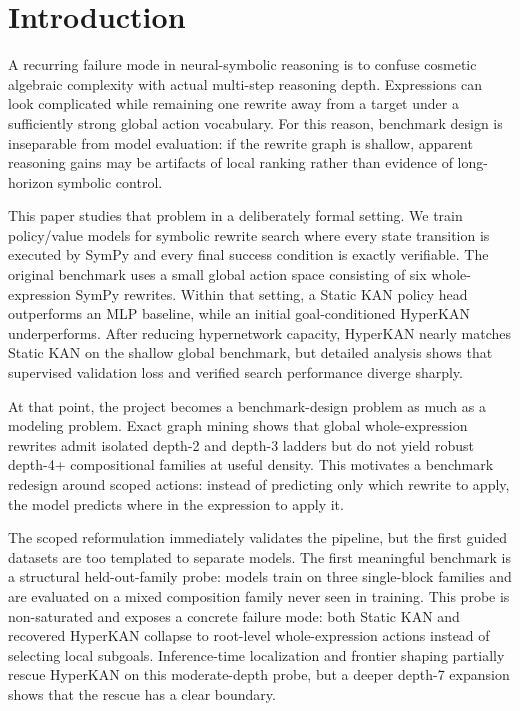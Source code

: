 \documentclass[11pt]{article}
\newcommand{\sympy}{SymPy}
\newcommand{\hyperkan}{HyperKAN}
\newcommand{\staticKAN}{Static KAN}
\newcommand{\mlp}{MLP}
\begin{document}
\section{Introduction}

A recurring failure mode in neural-symbolic reasoning is to confuse cosmetic algebraic complexity with actual multi-step reasoning depth. Expressions can look complicated while remaining one rewrite away from a target under a sufficiently strong global action vocabulary. For this reason, benchmark design is inseparable from model evaluation: if the rewrite graph is shallow, apparent reasoning gains may be artifacts of local ranking rather than evidence of long-horizon symbolic control.

This paper studies that problem in a deliberately formal setting. We train policy/value models for symbolic rewrite search where every state transition is executed by \sympy{} and every final success condition is exactly verifiable. The original benchmark uses a small global action space consisting of six whole-expression \sympy{} rewrites. Within that setting, a \staticKAN{} policy head outperforms an \mlp{} baseline, while an initial goal-conditioned \hyperkan{} underperforms. After reducing hypernetwork capacity, \hyperkan{} nearly matches \staticKAN{} on the shallow global benchmark, but detailed analysis shows that supervised validation loss and verified search performance diverge sharply.

At that point, the project becomes a benchmark-design problem as much as a modeling problem. Exact graph mining shows that global whole-expression rewrites admit isolated depth-2 and depth-3 ladders but do not yield robust depth-4+ compositional families at useful density. This motivates a benchmark redesign around scoped actions: instead of predicting only which rewrite to apply, the model predicts where in the expression to apply it.

The scoped reformulation immediately validates the pipeline, but the first guided datasets are too templated to separate models. The first meaningful benchmark is a structural held-out-family probe: models train on three single-block families and are evaluated on a mixed composition family never seen in training. This probe is non-saturated and exposes a concrete failure mode: both \staticKAN{} and recovered \hyperkan{} collapse to root-level whole-expression actions instead of selecting local subgoals. Inference-time localization and frontier shaping partially rescue \hyperkan{} on this moderate-depth probe, but a deeper depth-7 expansion shows that the rescue has a clear boundary.
\end{document}
